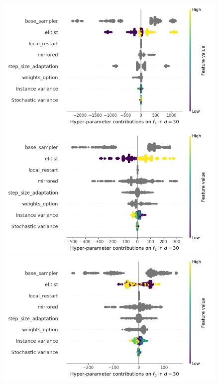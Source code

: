 \begin{figure}[t]
\centering
	\includegraphics[height=0.15\textheight,trim=0mm 0mm 30mm 0mm,clip]{images/img_summary_f1_d30.png}
	\includegraphics[height=0.15\textheight,trim=60mm 0mm 30mm 0mm,clip]{images/img_summary_f2_d30.png}
	\includegraphics[height=0.15\textheight,trim=60mm 0mm 30mm 0mm,clip]{images/img_summary_f3_d30.png}

\end{figure}
